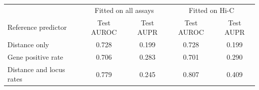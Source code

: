 \begin{tabular}{lcccc}
\toprule
 & \multicolumn{2}{c}{Fitted on all assays} & \multicolumn{2}{c}{Fitted on Hi-C} \\
Reference predictor & Test AUROC & Test AUPR & Test AUROC & Test AUPR \\
\midrule
Distance only & 0.728 & 0.199 & 0.728 & 0.199 \\
Gene positive rate & 0.706 & 0.283 & 0.701 & 0.290 \\
Distance and locus rates & 0.779 & 0.245 & 0.807 & 0.409 \\
\bottomrule
\end{tabular}
